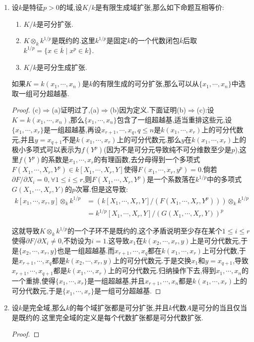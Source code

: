 \begin{enumerate}
\begin{proof}
		设$K/k$是可分生成扩张,记可分超越基为$X$.任取$k$的域扩张$k'$,那么$k(X)\otimes_kk'$是$k[X]\otimes_kk'=k'[X]$的分式域,于是$k(X)\otimes_kk'$是整环,并且商域是$k'(X)$.于是$K\otimes_kk'=K\otimes_{k(X)}(k(X)\otimes_kk')$是$K\otimes_{k(X)}k'(X)$的子环.由于$k(X)\subseteq K$是可分代数扩张,就导致$K\otimes_{k(X)}k'(X)$是既约环,于是它的子环$K\otimes_kk'$也是既约环.
	\end{proof}
	\item 设$k$是特征$p>0$的域,设$K/k$是有限生成域扩张,那么如下命题互相等价:
	\begin{enumerate}
		\item $K/k$是可分扩张.
		\item $K\otimes_kk^{1/p}$是既约的.这里$k^{1/p}$是固定$k$的一个代数闭包$\overline{k}$后取$k^{1/p}=\{x\in\overline{k}\mid x^p\in k\}$.
		\item $K/k$是可分生成扩张.
	\end{enumerate}
	
	如果$K=k(x_1,\cdots,x_n)$是$k$的有限生成的可分扩张,那么可以从$\{x_1,\cdots,x_n\}$中选取一组可分超越基.
	\begin{proof}
		
		(c)$\Rightarrow$(a)证明过了,(a)$\Rightarrow$(b)因为定义.下面证明(b)$\Rightarrow$(c):设$K=k(x_1,\cdots,x_n)$,那么$\{x_1,\cdots,x_n\}$包含了一组超越基,适当重排这些元,设$\{x_1,\cdots,x_r\}$是一组超越基,再设$x_{r+1},\cdots,x_q,q\le n$是$k(x_1,\cdots,x_r)$上的可分代数元,并且$y=x_{q+1}$不是$k(x_1,\cdots,x_r)$上的可分代数元.那么$y$在$k(x_1,\cdots,x_r)$上的极小多项式可以表示为$f(Y^p)$(因为不是可分元导致纯不可分维数至少是$p$),这里$f(Y^p)$的系数是$x_1,\cdots,x_r$的有理函数,去分母得到一个多项式$F(X_1,\cdots,X_r,Y^p)\in k[X_1,\cdots,X_r,Y]$使得$F(x_1,\cdots,x_r,y^p)=0$.倘若$\partial F/\partial X_i=0,\forall 1\le i\le r$,则$F(X_1,\cdots,X_r,Y^p)$是一个系数落在$k^{1/p}$中的多项式$G(X_1,\cdots,X_r,Y)$的$p$次幂.但是这导致:
		\begin{align*}
			k[x_1,\cdots,x_r,y]\otimes_kk^{1/p}&=(k[X_1,\cdots,X_r,Y]/(F(X_1,\cdots,X_r,Y^p)))\otimes_kk^{1/p}\\&=k^{1/p}[X_1,\cdots,X_r,Y]/(G(X_1,\cdots,X_r,Y))^p
		\end{align*}
		
		这就导致$K\otimes_kk^{1/p}$的一个子环不是既约的,这个矛盾说明至少存在某个$1\le i\le r$使得$\partial F/\partial X_i\not=0$,不妨设为$i=1$.这导致$x_1$在$k(x_2,\cdots,x_r,y)$上是可分代数元,于是$\{x_2,\cdots,x_r,y\}$也是一组超越基.而$x_{r+1},\cdots,x_q$都在$k(x_1,\cdots,x_r)$上可分代数,于是$x_{r+1},\cdots,x_q$都是$k(x_2,\cdots,x_r,y)$上的可分代数元.于是交换$x_1$和$y=x_{q+1}$,导致$x_{r+1},\cdots,x_{q+1}$都是$k(x_1,\cdots,x_r)$上的可分代数元.归纳操作下去,得到$x_1,\cdots,x_n$的一个重排,使得$\{x_1,\cdots,x_r\}$是一组超越基,并且$x_{r+1},\cdots,x_n$都是$k(x_1,\cdots,x_r)$上的可分代数元,于是$\{x_1,\cdots,x_r\}$是一组可分超越基.
	\end{proof}
	\item 设$k$是完全域,那么$k$的每个域扩张都是可分扩张,并且$k$代数$A$是可分的当且仅当是既约的.这里完全域的定义是每个代数扩张都是可分代数扩张.
	\begin{proof}
		

\end{proof}
\end{enumerate}
